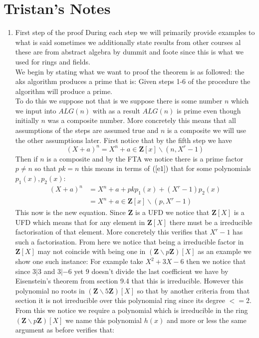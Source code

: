 \section{Tristan's Notes}

\begin{enumerate}
    \item First step of the proof 
During each step we will primarily provide examples to what is said sometimes we additionally state results from other courses al these are from abstract algebra by dummit and foote since this is what we used for rings and fields. \\
We begin by stating what we want to proof the theorem is as followed: the aks algorithm produces a prime that is: Given steps 1-6 of the procedure the algorithm will produce a prime. \\ 
To do this  we suppose not that is we suppose there is some number $n$ which we input into $ALG(n)$ with as a result $ALG(n)$ is prime even though initially $n$ was a composite number.  More concretely this means that all assumptions of the steps are assumed true and $n$ is a composite we will use the other assumptions later. First notice that by the fifth step we have 
\begin{equation}
    (X+a)^n = X^n+a \in \mathbf{Z}[x]\backslash(n,X^r-1)
    \label{e1}
\end{equation}
Then if $n$ is a composite and by the FTA we notice there is a prime factor $p\neq n$ so that $pk=n$ this means in terms of $(\ref{e1})$ that for some polynomials $p_1(x),p_2(x)$:
\begin{equation}
    \begin{split}
        (X+a)^n &= X^n+a+pkp_1(x)+(X^r-1)p_2(x)\\
                &= X^n+a\in \mathbf{Z}[x]\backslash(p,X^r-1)
                \label{e2}
    \end{split}
\end{equation}
This now is the new equation. Since $\mathbf{Z}$ is a UFD we notice that $\mathbf{Z}[X]$ is a UFD which means that for any element in $\mathbf{Z}[X]$ there must be a irreducible factorisation of that element. More concretely this verifies that $X^r-1$ has such a factorisation. From here we notice that being a irreducible factor in $\mathbf{Z}[X]$ may not coincide with being one in $(\mathbf{Z}\backslash p\mathbf{Z})[X]$ as an example we show one such instance: For example take $X^2+3X-6$ then we notice that since $3|3$ and $3|-6$ yet $9$ doesn't divide the last coefficient we have by Eisenstein's theorem from section 9.4 that this is irreducible. However this polynomial no roots in $(\mathbf{Z}\backslash 5\mathbf{Z})[X]$ so that by another criteria from that section it is not irreducible over this polynomial ring since its degree $<=2$. From this we notice we require a polynomial which is irreducible in the ring $(\mathbf{Z}\backslash p\mathbf{Z})[X]$ we name this polynomial $h(x)$ and more or less the same argument as before verifies that:

\end{enumerate}
